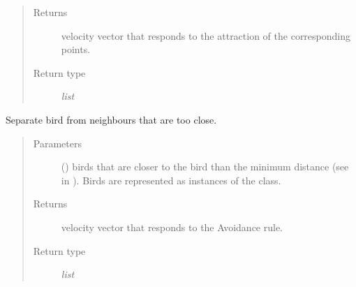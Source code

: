 \documentclass[a4paper,11pt,oneside,english]{sphinxmanual}
\begin{document}
\begin{fulllineitems}
\begin{fulllineitems}
\begin{quote}
\begin{description}
\item[{Returns}] \leavevmode
velocity vector that responds to the attraction of the corresponding points.

\item[{Return type}] \leavevmode
\textit{list}

\end{description}\end{quote}

\bigskip 
\bigskip 

\end{fulllineitems}


\begin{fulllineitems}
\label{\detokenize{bird:bird.Bird.avoidance}}
Separate bird from neighbours that are too close.
\begin{quote}\begin{description}
\item[{Parameters}] \leavevmode
{} () \textendash{} birds that are closer to the bird than the minimum distance (see  in {\hyperref[\detokenize{parameters:module-0}]{}}). Birds are represented as instances of the {\hyperref[\detokenize{bird:bird.Bird}]{}} class.

\item[{Returns}] \leavevmode
velocity vector that responds to the Avoidance rule.

\item[{Return type}] \leavevmode
\textit{list}

\end{description}\end{quote}

\bigskip 
\bigskip 

\end{fulllineitems}



\end{fulllineitems}
\end{document}
